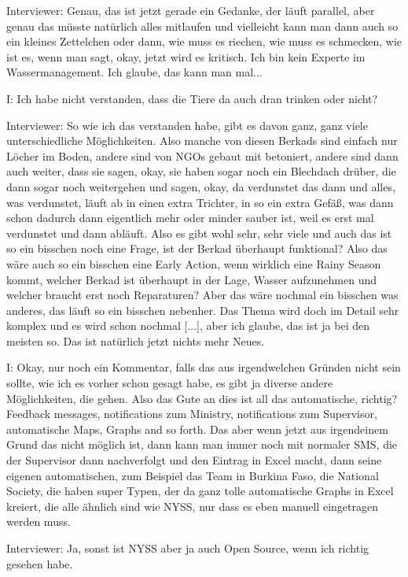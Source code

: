 Interviewer: Genau, das ist jetzt gerade ein Gedanke, der läuft parallel, aber genau das müsste natürlich alles mitlaufen und vielleicht kann man dann auch so ein kleines Zettelchen oder dann, wie muss es riechen, wie muss es schmecken, wie ist es, wenn man sagt, okay, jetzt wird es kritisch. Ich bin kein Experte im Wassermanagement. Ich glaube, das kann man mal... 

I: Ich habe nicht verstanden, dass die Tiere da auch dran trinken oder nicht? 

Interviewer: So wie ich das verstanden habe, gibt es davon ganz, ganz viele unterschiedliche Möglichkeiten. Also manche von diesen Berkads sind einfach nur Löcher im Boden, andere sind von NGOs gebaut mit betoniert, andere sind dann auch weiter, dass sie sagen, okay, sie haben sogar noch ein Blechdach drüber, die dann sogar noch weitergehen und sagen, okay, da verdunstet das dann und alles, was verdunstet, läuft ab in einen extra Trichter, in so ein extra Gefäß, was dann schon dadurch dann eigentlich mehr oder minder sauber ist, weil es erst mal verdunstet und dann abläuft. Also es gibt wohl sehr, sehr viele und auch das ist so ein bisschen noch eine Frage, ist der Berkad überhaupt funktional? Also das wäre auch so ein bisschen eine Early Action, wenn wirklich eine Rainy Season kommt, welcher Berkad ist überhaupt in der Lage, Wasser aufzunehmen und welcher braucht erst noch Reparaturen? Aber das wäre nochmal ein bisschen was anderes, das läuft so ein bisschen nebenher. Das Thema wird doch im Detail sehr komplex und es wird schon nochmal [...], aber ich glaube, das ist ja bei den meisten so. Das ist natürlich jetzt nichts mehr Neues. 

I: Okay, nur noch ein Kommentar, falls das aus irgendwelchen Gründen nicht sein sollte, wie ich es vorher schon gesagt habe, es gibt ja diverse andere Möglichkeiten, die gehen. Also das Gute an dies ist all das automatische, richtig? Feedback messages, notifications zum Ministry, notifications zum Supervisor, automatische Maps, Graphs and so forth. Das aber wenn jetzt aus irgendeinem Grund das nicht möglich ist, dann kann man immer noch mit normaler SMS, die der Supervisor dann nachverfolgt und den Eintrag in Excel macht, dann seine eigenen automatischen, zum Beispiel das Team in Burkina Faso, die National Society, die haben super Typen, der da ganz tolle automatische Graphs in Excel kreiert, die alle ähnlich sind wie NYSS, nur dass es eben manuell eingetragen werden muss. 

Interviewer: Ja, sonst ist NYSS aber ja auch Open Source, wenn ich richtig gesehen habe.

